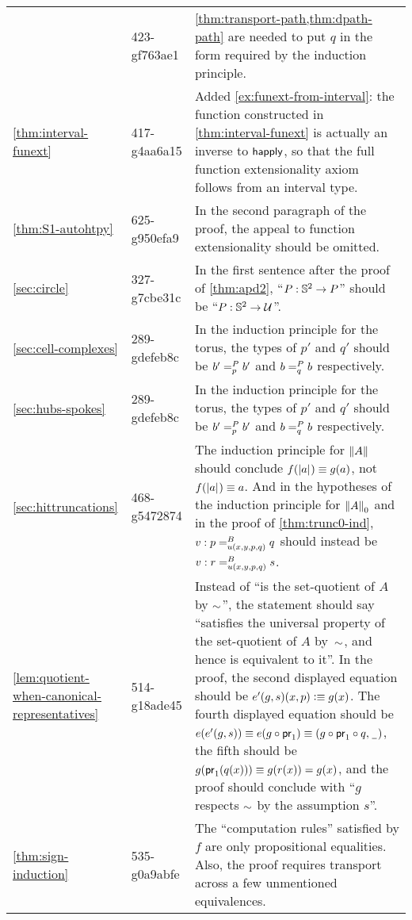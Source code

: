 \documentclass[
%
%
11pt %
]{article}
\begin{document}
\begin{longtable}{llp{10.5cm}}
  & 423-gf763ae1
  & \cref{thm:transport-path,thm:dpath-path} are needed to put $q$ in the form required by the induction principle.\\
  \cref{thm:interval-funext}
  & 417-g4aa6a15
  & Added \cref{ex:funext-from-interval}: the function constructed in \cref{thm:interval-funext} is actually an inverse to $\happly$, so that the full function extensionality axiom follows from an interval type.\\
  \cref{thm:S1-autohtpy}
  & 625-g950efa9
  & In the second paragraph of the proof, the appeal to function extensionality should be omitted.\\
  \cref{sec:circle}
  & 327-g7cbe31c
  & In the first sentence after the proof of \cref{thm:apd2}, ``$P:\Sn^2\to P$'' should be ``$P:\Sn^2\to\type$''.\\
  \cref{sec:cell-complexes}
  & 289-gdefeb8c
  & In the induction principle for the torus, the types of $p'$ and $q'$ should be $\dpath P p {b'} {b'}$ and $\dpath P q b b$ respectively.\\
  \cref{sec:hubs-spokes}
  & 289-gdefeb8c
  & In the induction principle for the torus, the types of $p'$ and $q'$ should be $\dpath P p {b'} {b'}$ and $\dpath P q b b$ respectively.\\
  \cref{sec:hittruncations}
  & 468-g5472874
  & The induction principle for $\brck{A}$ should conclude $f(\bproj a)\jdeq g(a)$, not $f(\bproj a)\jdeq a$.  And in the hypotheses of the induction principle for $\trunc0 A$ and in the proof of \cref{thm:trunc0-ind}, $v:\dpath{B}{u(x,y,p,q)}{p}{q}$ should instead be $v:\dpath{B}{u(x,y,p,q)}{r}{s}$.\\
  \cref{lem:quotient-when-canonical-representatives}
  & 514-g18ade45
  & Instead of ``is the set-quotient of $A$ by $\eqr$'', the statement should say ``satisfies the universal property of the set-quotient of $A$ by~$\eqr$, and hence is equivalent to it''.
  In the proof, the second displayed equation should be $e'(g, s) (x,p) \defeq g(x)$.
  The fourth displayed equation should be $e(e'(g, s)) \jdeq e(g \circ \proj{1}) \jdeq (g \circ \proj{1} \circ q, {\nameless})$, the fifth should be $g(\proj{1}(q(x))) \jdeq g(r(x)) = g(x)$, and the proof should conclude with ``$g$ respects $\eqr$ by the assumption $s$''.\\
  \cref{thm:sign-induction}
  & 535-g0a9abfe
  & The ``computation rules'' satisfied by $f$ are only propositional equalities.
  Also, the proof requires transport across a few unmentioned equivalences.\\

\end{longtable}
\end{document}
